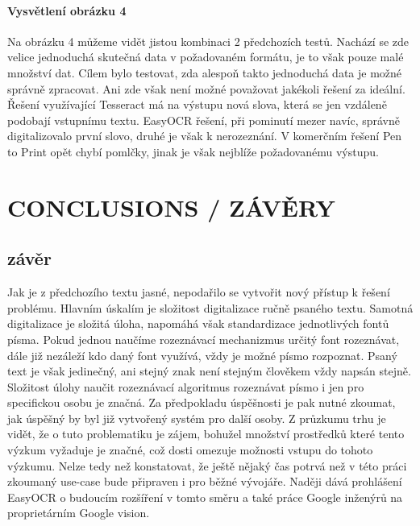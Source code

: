 \documentclass[journal]{IEEEtran}
\begin{document}
\paragraph{Vysvětlení obrázku 4}
Na obrázku 4 můžeme vidět jistou kombinaci 2 předchozích testů.
Nachází se zde velice jednoduchá skutečná data v požadovaném formátu, je to však pouze malé množství dat.
Cílem bylo testovat, zda alespoň takto jednoduchá data je možné správně zpracovat.
Ani zde však není možné považovat jakékoli řešení za ideální.
Řešení využívající Tesseract má na výstupu nová slova, která se jen vzdáleně podobají vstupnímu textu.
EasyOCR řešení, při pominutí mezer navíc, správně digitalizovalo první slovo,  druhé je však k nerozeznání.
V komerčním řešení Pen to Print opět chybí pomlčky, jinak je však nejblíže požadovanému výstupu.


\section{CONCLUSIONS / ZÁVĚRY}
\subsection{závěr}
Jak je z předchozího textu jasné, nepodařilo se vytvořit nový přístup k řešení problému.
Hlavním úskalím je složitost digitalizace ručně psaného textu.
Samotná digitalizace je složitá úloha, napomáhá však standardizace jednotlivých fontů písma.
Pokud jednou naučíme rozeznávací mechanizmus určitý font rozeznávat, dále již nezáleží kdo daný font využívá, vždy je možné písmo rozpoznat.
Psaný text je však jedinečný, ani stejný znak není stejným člověkem vždy napsán stejně.
Složitost úlohy naučit rozeznávací algoritmus rozeznávat písmo i jen pro specifickou osobu je značná.
Za předpokladu úspěšnosti je pak nutné zkoumat, jak úspěšný by byl již vytvořený systém pro další osoby.
Z průzkumu trhu je vidět, že o tuto problematiku je zájem, bohužel množství prostředků které tento výzkum vyžaduje je značné, což dosti omezuje možnosti vstupu do tohoto výzkumu.
Nelze tedy než konstatovat, že ještě nějaký čas potrvá než v této práci zkoumaný use-case bude připraven i pro běžné vývojáře.
Naději dává prohlášení EasyOCR o budoucím rozšíření v tomto směru a také práce Google inženýrů na proprietárním Google vision.



\printbibliography

\printacronyms


\end{document}
